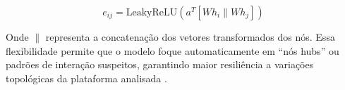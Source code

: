 \begin{equation}
e_{ij} = \text{LeakyReLU} \left( a^T [Wh_i \parallel Wh_j] \right)
\end{equation}

Onde $\parallel$ representa a concatenação dos vetores transformados dos nós. Essa flexibilidade permite que o modelo foque automaticamente em ``nós hubs'' ou padrões de interação suspeitos, garantindo maior resiliência a variações topológicas da plataforma analisada \cite{velickovic2018gat, cogent_nlpmisinformation}.
